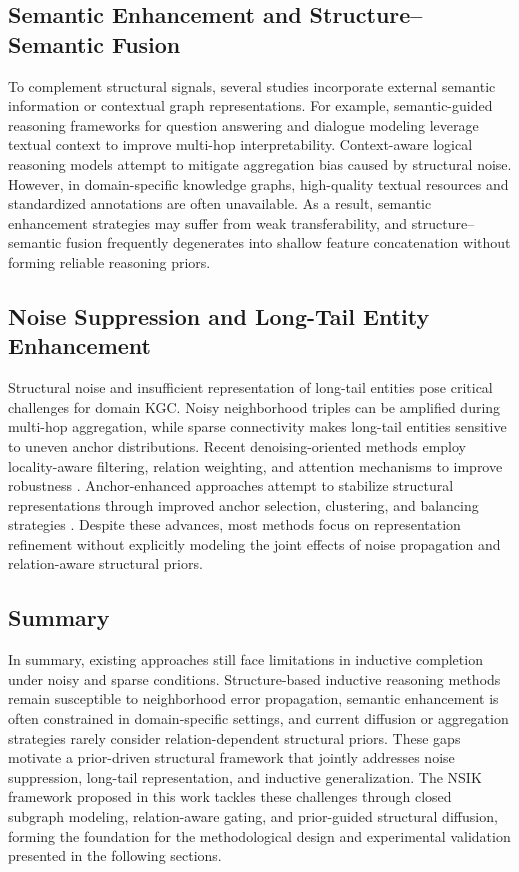 \documentclass[preprint,12pt]{elsarticle}
\begin{document}
\subsection{Semantic Enhancement and Structure–Semantic Fusion}

To complement structural signals, several studies incorporate external semantic information or contextual graph representations. For example, semantic-guided reasoning frameworks for question answering and dialogue modeling \cite{qa-gnn,dialogkg} leverage textual context to improve multi-hop interpretability. Context-aware logical reasoning models \cite{context-logic} attempt to mitigate aggregation bias caused by structural noise. However, in domain-specific knowledge graphs, high-quality textual resources and standardized annotations are often unavailable. As a result, semantic enhancement strategies may suffer from weak transferability, and structure–semantic fusion frequently degenerates into shallow feature concatenation without forming reliable reasoning priors.

\subsection{Noise Suppression and Long-Tail Entity Enhancement}

Structural noise and insufficient representation of long-tail entities pose critical challenges for domain KGC. Noisy neighborhood triples can be amplified during multi-hop aggregation, while sparse connectivity makes long-tail entities sensitive to uneven anchor distributions. Recent denoising-oriented methods employ locality-aware filtering, relation weighting, and attention mechanisms to improve robustness \cite{locality-aware-pattern,structure-attn,multi-level-sampling}. Anchor-enhanced approaches attempt to stabilize structural representations through improved anchor selection, clustering, and balancing strategies \cite{relation-aware-anchor,one-subgraph,conee,multi-granularity,hierarchical-reconstruct}. Despite these advances, most methods focus on representation refinement without explicitly modeling the joint effects of noise propagation and relation-aware structural priors.

\subsection{Summary}

In summary, existing approaches still face limitations in inductive completion under noisy and sparse conditions. Structure-based inductive reasoning methods remain susceptible to neighborhood error propagation, semantic enhancement is often constrained in domain-specific settings, and current diffusion or aggregation strategies rarely consider relation-dependent structural priors. These gaps motivate a prior-driven structural framework that jointly addresses noise suppression, long-tail representation, and inductive generalization. The NSIK framework proposed in this work tackles these challenges through closed subgraph modeling, relation-aware gating, and prior-guided structural diffusion, forming the foundation for the methodological design and experimental validation presented in the following sections.
\end{document}
